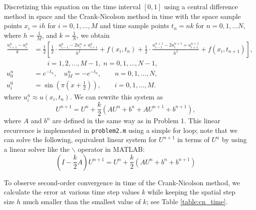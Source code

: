 \documentclass{homework}
\begin{document}
	\question
	
	
	\begin{alphaparts}
		\questionpart
		Discretizing this equation on the time interval $[0,1]$ using a central difference method in space and the Crank-Nicolson method in time with the space sample points $x_i = ih$ for $i =0,1,\dots, M$ and time sample points $t_n = nk$ for $n=0,1,\dots N$, where $h = \frac{1}{M}$, and $k = \frac{1}{N}$, we obtain
		\begin{align*}
			\frac{u^n_{i+1} - u^n_i}{k} &= \frac{1}{2}\left[\frac{1}{2}\cdot\frac{u^n_{i-1}-2u^n_i + u^n_{i+1}}{h^2} + f(x_i,t_n) + \frac{1}{2}\cdot\frac{u^{n+1}_{i-1}-2u^{n+1}_i + u^{n+1}_{i+1}}{h^2} + f(x_i,t_{n+1})\right],\\
			 &\qquad i =1,2,\dots, M-1, \; n = 0,1,\dots, N-1,\\
			u^n_0 &= e^{-t_n}, \quad u^n_{M} = -e^{-t_n}, \qquad n = 0,1,\dots, N,\\
			u^0_i &= \sin\left(\pi\left(x+\frac{1}{2}\right)\right), \qquad i = 0,1,\dots, M.
		\end{align*}
		where $u^n_i \approx u(x_i, t_n)$. We can rewrite this system as
		\begin{equation*}
			U^{n+1} = U^n + \frac{k}{2}\left(AU^n + b^n+AU^{n+1} + b^{n+1}\right),
		\end{equation*}
		where $A$ and $b^n$ are defined in the same way as in Problem 1. This linear recurrence is implemented in \verb*|problem2.m| using a simple for loop; note that we can solve the following, equivalent linear system for $U^{n+1}$ in terms of $U^n$ by using a linear solver like the \texttt{$\backslash$} operator in MATLAB:
		\begin{equation*}
			\left(I - \frac{k}{2}A\right)U^{n+1} = U^n + \frac{k}{2}\left(AU^n + b^n + b^{n+1}\right)
		\end{equation*}
		
		\questionpart To observe second-order convergence in time of the Crank-Nicolson method, we calculate the error at various time step values $k$ while keeping the spatial step size $h$ much smaller than the smallest value of $k$; see Table \ref{table:cn_time}.
		

\end{alphaparts}
\end{document}
